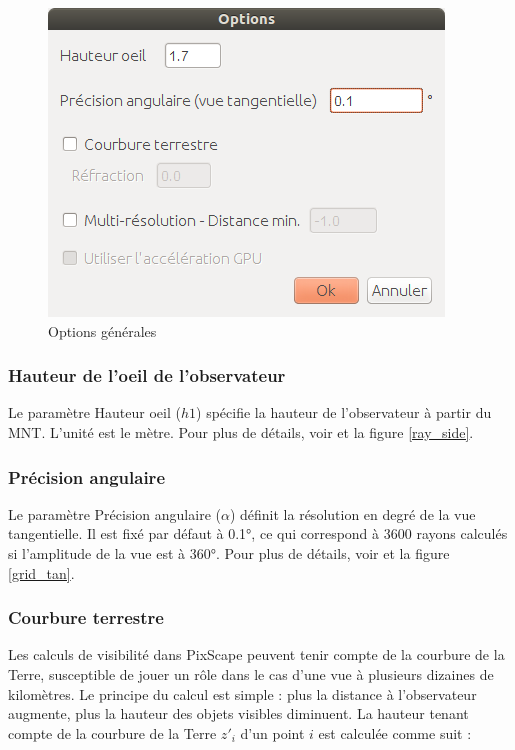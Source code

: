 \documentclass{report}
\begin{document}
\begin{figure}[H]
	\includegraphics[scale=0.5]{img/options-fr.png} 
	\caption{Options générales}
\end{figure}

\subsubsection{Hauteur de l'oeil de l'observateur}
Le paramètre Hauteur oeil ($h1$) spécifie la hauteur de l'observateur à partir du MNT. L'unité est le mètre. Pour plus de détails, voir  et la figure \ref{ray_side}.

\subsubsection{Précision angulaire}
Le paramètre Précision angulaire ($\alpha$) définit la résolution en degré de la vue tangentielle. Il est fixé par défaut à 0.1°, ce qui correspond à 3600 rayons calculés si l'amplitude de la vue est à 360°. Pour plus de détails, voir  et la figure \ref{grid_tan}. 

\subsubsection{Courbure terrestre}
\label{curvature}
Les calculs de visibilité dans PixScape peuvent tenir compte de la courbure de la Terre, susceptible de jouer un rôle dans le cas d'une vue à plusieurs dizaines de kilomètres. Le principe du calcul est simple : plus la distance à l'observateur augmente, plus la hauteur des objets visibles diminuent. 
La hauteur tenant compte de la courbure de la Terre $z'_i$ d'un point $i$ est calculée comme suit : 
\end{document}
